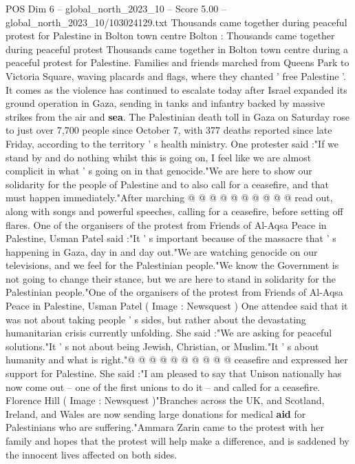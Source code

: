 \begin{textsample}{POS Dim 6 – global\_north\_2023\_10 – Score 5.00 – global\_north\_2023\_10/103024129.txt}  \label{ex:f6_pos_243}
Thousands came together during peaceful protest for Palestine in Bolton town centre Bolton : Thousands came together during peaceful protest Thousands came together in Bolton town centre during a peaceful protest for Palestine.
Families and friends marched from Queens Park to Victoria Square, waving placards and flags, where they chanted ' free Palestine '.
It comes as the violence has continued to escalate today after Israel expanded its ground operation in Gaza, sending in tanks and infantry backed by massive strikes from the air and \textbf{sea}.
The Palestinian death toll in Gaza on Saturday rose to just over 7,700 people since October 7, with 377 deaths reported since late Friday, according to the territory ' s health ministry.
One protester said :"If we stand by and do nothing whilst this is going on, I feel like we are almost complicit in what ' s going on in that genocide."We are here to show our solidarity for the people of Palestine and to also call for a ceasefire, and that must happen immediately."After marching @ @ @ @ @ @ @ @ @ @ read out, along with songs and powerful speeches, calling for a ceasefire, before setting off flares.
One of the organisers of the protest from Friends of Al-Aqsa Peace in Palestine, Usman Patel said :"It ' s important because of the massacre that ' s happening in Gaza, day in and day out."We are watching genocide on our televisions, and we feel for the Palestinian people."We know the Government is not going to change their stance, but we are here to stand in solidarity for the Palestinian people."One of the organisers of the protest from Friends of Al-Aqsa Peace in Palestine, Usman Patel ( Image : Newsquest ) One attendee said that it was not about taking people ' s sides, but rather about the devastating humanitarian crisis currently unfolding.
She said :"We are asking for peaceful solutions."It ' s not about being Jewish, Christian, or Muslim."It ' s about humanity and what is right."@ @ @ @ @ @ @ @ @ @ ceasefire and expressed her support for Palestine.
She said :"I am pleased to say that Unison nationally has now come out -- one of the first unions to do it -- and called for a ceasefire.
Florence Hill ( Image : Newsquest )"Branches across the UK, and Scotland, Ireland, and Wales are now sending large donations for medical \textbf{aid} for Palestinians who are suffering."Ammara Zarin came to the protest with her family and hopes that the protest will help make a difference, and is saddened by the innocent lives affected on both sides.

\end{textsample}
